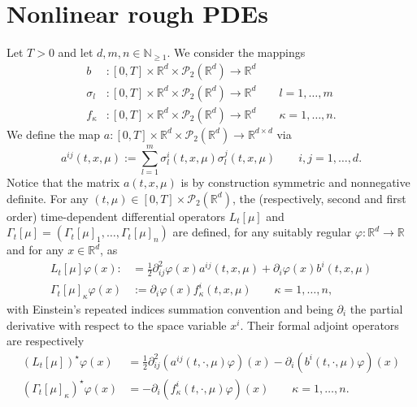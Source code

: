 \documentclass[10pt, a4paper]{article} %
\newcommand{\R}{\mathbb{R}}
\theoremstyle{definition}
\theoremstyle{plain}
\begin{document}
\section{Nonlinear rough PDEs} \label{section:solvingmeanfieldroughPDEs}
Let $T>0$ and let $d,m,n \in \mathbb{N}_{\ge 1}$. 
We consider the mappings \begin{equation} \label{eq:coefficients_meanfieldRPDE}
    \begin{aligned}
        b&
    : [0,T] \times \R^d \times \mathcal{P}_2(\R^d) \to \R^d \\
    \sigma_l &
    : [0,T] \times \R^d \times \mathcal{P}_2(\R^d) \to \R^d \qquad l=1,\dots,m \\
    f_\kappa &
    : [0,T] \times \R^d \times \mathcal{P}_2(\R^d) \to \R^d \qquad \kappa=1,\dots,n.
    \end{aligned}
\end{equation}
We define the map $a:[0,T] \times \R^d \times \mathcal{P}_2(\R^d) \to \R^{d\times d}$
via $$a^{ij}(t,x,\mu) := \sum_{l=1}^m \sigma^i_l(t,x,\mu) \sigma^j_l(t,x,\mu) \qquad i,j=1,\dots,d .$$
Notice that the matrix $a(t,x,\mu)$ is by construction symmetric and nonnegative definite. 
For any $(t,\mu) \in [0,T] \times \mathcal{P}_2(\R^d)$, the (respectively, second and first order) time-dependent differential operators $L_t[\mu]$ and $\Gamma_t[\mu]=(\Gamma_t[\mu]_1,\dots, \Gamma_t[\mu]_n)$ are defined, for any suitably regular $\varphi:\R^d \to \R$ and for any $x \in \R^d$, as 
\begin{align*}
    L_t[\mu] \varphi (x) :&= \frac{1}{2} \partial^2_{ij} \varphi(x) a^{ij}(t,x,\mu) + \partial_i \varphi (x) b^i(t,x,\mu) \\ 
    \Gamma_t[\mu]_\kappa \varphi(x) & := \partial_i \varphi(x) f^i_\kappa(t,x,\mu) \qquad \kappa=1,\dots,n , 
\end{align*}
with Einstein's repeated indices summation convention and being $\partial_i$ the partial derivative with respect to the space variable $x^i$.
Their formal adjoint operators are respectively
\begin{align*}
    (L_t[\mu])^\star \varphi(x) &= \frac{1}{2} \partial^2_{ij} (a^{ij}(t,\cdot,\mu) \varphi)(x)  - \partial_i (b^i(t,\cdot,\mu) \varphi)(x) \\ 
    (\Gamma_t[\mu]_\kappa)^\star \varphi(x) & = - \partial_i (f_\kappa^i(t,\cdot,\mu) \varphi) (x) \qquad \kappa=1,\dots,n . 
\end{align*}
\end{document}

